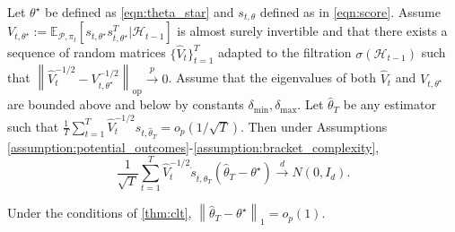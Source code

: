 \documentclass[10pt,a4paper]{amsart}
\newcommand{\norm}[1]{\left\lVert#1\right\rVert}
\begin{document}
\begin{theorem} \label{thm:clt} 
Let $\theta^{\star}$ be defined as \cref{eqn:theta_star} and $s_{t,\theta}$ defined as in \cref{eqn:score}. Assume $V_{t,\theta^{\star}} := \mathbb{E}_{\mathcal{P},\pi_{t}}\left[ s_{t,\theta^{\star}}s_{t,\theta^{\star}}^{T} | \mathcal{H}_{t-1}\right]$ is almost surely invertible and that there exists a sequence of random matrices $\{\hat{V}_{t}\}_{t=1}^{T}$ adapted to the filtration $\sigma(\mathcal{H}_{t-1})$ such that $\norm{\hat{V}_{t}^{-1/2} - V_{t,\theta^{\star}}^{-1/2}}_{\text{op}} \overset{p}{\to} 0$. Assume that the eigenvalues of both $\hat{V}_{t}$ and $V_{t,\theta^{\star}}$ are bounded above and below by constants $\delta_{\text{min}}, \delta_{\text{max}}$.  Let $\hat{\theta}_{T}$ be any estimator such that  $\frac{1}{T}\sum_{t=1}^{T}\hat{V}_{t}^{-1/2} s_{t,\hat{\theta}_{T}} = o_{p}(1/\sqrt{T})$. 
Then under Assumptions \ref{assumption:potential_outcomes}-\ref{assumption:bracket_complexity},
$$\frac{1}{\sqrt{T}} \sum_{t=1}^{T}\hat{V}_{t}^{-1/2} \dot{s}_{t,\hat{\theta}_{T}} \left(\hat{\theta}_{T}- \theta^{\star} \right) \overset{d}{\to} N(0,I_{d}).$$
\end{theorem}

\begin{lemma} \label{lemma:consistency}
Under the conditions of \cref{thm:clt}, $\norm{\hat{\theta}_{T}-  \theta^{\star}}_{1} = o_{p}(1)$.
\end{lemma}
\end{document}
